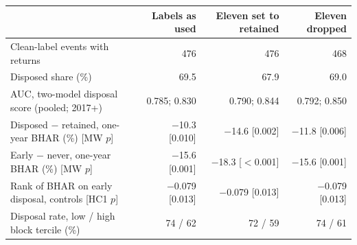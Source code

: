 \begin{tabular}{>{\raggedright\arraybackslash}p{6.2cm}rrr}
\toprule
 & Labels as used & Eleven set to retained & Eleven dropped \\
\midrule
Clean-label events with returns & 476 & 476 & 468 \\
Disposed share (\%) & 69.5 & 67.9 & 69.0 \\
AUC, two-model disposal score (pooled; 2017+) & 0.785; 0.830 & 0.790; 0.844 & 0.792; 0.850 \\
Disposed $-$ retained, one-year BHAR (\%) [MW $p$] & $-$10.3 [0.010] & $-$14.6 [0.002] & $-$11.8 [0.006] \\
Early $-$ never, one-year BHAR (\%) [MW $p$] & $-$15.6 [0.001] & $-$18.3 [$<$0.001] & $-$15.6 [0.001] \\
Rank of BHAR on early disposal, controls [HC1 $p$] & $-$0.079 [0.013] & $-$0.079 [0.013] & $-$0.079 [0.013] \\
Disposal rate, low / high block tercile (\%) & 74 / 62 & 72 / 59 & 74 / 61 \\
\bottomrule
\end{tabular}
